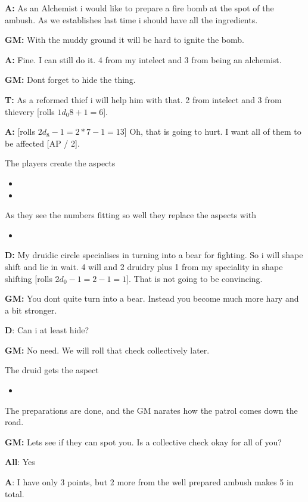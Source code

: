 \documentclass[11pt]{article}
\begin{document}
{\textbf{A:} As an Alchemist i would like to prepare a fire bomb at the spot of the ambush. As we establishes last time i should have all the ingredients.

\textbf{GM:} With the muddy ground it will be hard to ignite the bomb.

\textbf{A:} Fine. I can still do it. 4 from my intelect and 3 from being an alchemist.

\textbf{GM:} Dont forget to hide the thing.

\textbf{T:} As a reformed thief i will help him with that. 2 from intelect and 3 from thievery [rolls \(1 d_0 8 + 1 = 6\)].

\textbf{A:} [rolls \(2 d_8 - 1 = 2*7 -1 = 13\)] Oh, that is going to hurt. I want all of them to be affected [AP / 2].

The players create the aspects
\begin{itemize}
\item {}
\item {}
\end{itemize}
As they see the numbers fitting so well they replace the aspects with
\begin{itemize}
\item {}
\end{itemize}

\textbf{D:} My druidic circle specialises in turning into a bear for fighting. So i will shape shift and lie in wait. 4 will and 2 druidry plus 1 from my speciality in shape shifting [rolls \(2 d_0 - 1 = 2 - 1 = 1\)]. That is not going to be convincing.

\textbf{GM:} You dont quite turn into a bear. Instead you become much more hary and a bit stronger.

\textbf{D}: Can i at least hide?

\textbf{GM:} No need. We will roll that check collectively later.

The druid gets the aspect
\begin{itemize}
\item {}
\end{itemize}

The preparations are done, and the GM narates how the patrol comes down the road.

\textbf{GM:} Lets see if they can spot you. Is a collective check okay for all of you?

\textbf{All}: Yes

\textbf{A}: I have only 3 points, but 2 more from the well prepared ambush makes 5 in total.

}
\end{document}
